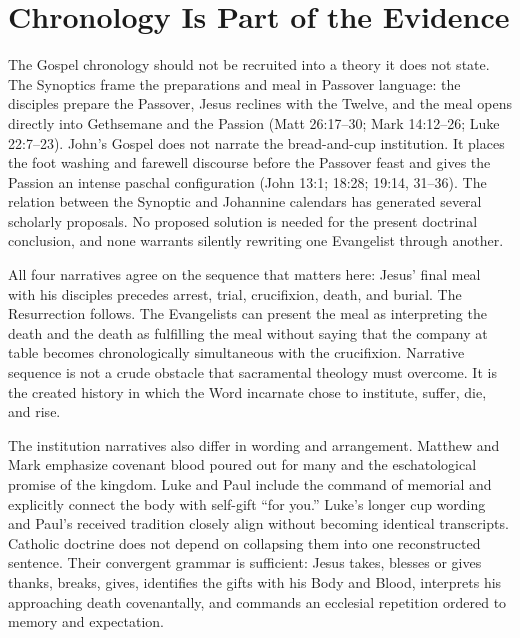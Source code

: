 \section{Chronology Is Part of the Evidence}

The Gospel chronology should not be recruited into a theory it does not state.
The Synoptics frame the preparations and meal in Passover language: the
disciples prepare the Passover, Jesus reclines with the Twelve, and the meal
opens directly into Gethsemane and the Passion (Matt 26:17--30; Mark
14:12--26; Luke 22:7--23). John's Gospel does not narrate the bread-and-cup
institution. It places the foot washing and farewell discourse before the
Passover feast and gives the Passion an intense paschal configuration (John
13:1; 18:28; 19:14, 31--36). The relation between the Synoptic and Johannine
calendars has generated several scholarly proposals. No proposed solution is
needed for the present doctrinal conclusion, and none warrants silently
rewriting one Evangelist through another.

All four narratives agree on the sequence that matters here: Jesus' final meal
with his disciples precedes arrest, trial, crucifixion, death, and burial. The
Resurrection follows. The Evangelists can present the meal as interpreting the
death and the death as fulfilling the meal without saying that the company at
table becomes chronologically simultaneous with the crucifixion. Narrative
sequence is not a crude obstacle that sacramental theology must overcome. It
is the created history in which the Word incarnate chose to institute,
suffer, die, and rise.

The institution narratives also differ in wording and arrangement. Matthew
and Mark emphasize covenant blood poured out for many and the eschatological
promise of the kingdom. Luke and Paul include the command of memorial and
explicitly connect the body with self-gift ``for you.'' Luke's longer cup
wording and Paul's received tradition closely align without becoming
identical transcripts. Catholic doctrine does not depend on collapsing them
into one reconstructed sentence. Their convergent grammar is sufficient:
Jesus takes, blesses or gives thanks, breaks, gives, identifies the gifts with
his Body and Blood, interprets his approaching death covenantally, and commands
an ecclesial repetition ordered to memory and expectation.

